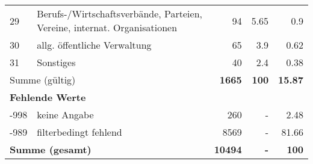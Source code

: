 \begin{longtable}{lXrrr}
        29 & \multicolumn{1}{X}{Berufs-/Wirtschaftsverbände, Parteien, Vereine, internat. Organisationen} & %
          \num{94} &
          \num[round-mode=places,round-precision=2]{5.65} &
          \num[round-mode=places,round-precision=2]{0.9} \\

        30 & \multicolumn{1}{X}{allg. öffentliche Verwaltung} & %
          \num{65} &
          \num[round-mode=places,round-precision=2]{3.9} &
          \num[round-mode=places,round-precision=2]{0.62} \\

        31 & \multicolumn{1}{X}{Sonstiges} & %
          \num{40} &
          \num[round-mode=places,round-precision=2]{2.4} &
          \num[round-mode=places,round-precision=2]{0.38} \\

     \midrule
     \multicolumn{2}{l}{Summe (gültig)} &
       \textbf{\num{1665}} &
     \textbf{\num{100}} &
       \textbf{\num[round-mode=places,round-precision=2]{15.87}} \\
     \multicolumn{5}{l}{\textbf{Fehlende Werte}}\\
       -998 &
       keine Angabe &
         \num{260} &
        - &
         \num[round-mode=places,round-precision=2]{2.48} \\
       -989 &
       filterbedingt fehlend &
         \num{8569} &
        - &
         \num[round-mode=places,round-precision=2]{81.66} \\
     \midrule
     \multicolumn{2}{l}{\textbf{Summe (gesamt)}} &
          \textbf{\num{10494}} &
        \textbf{-} &
        \textbf{\num{100}} \\
     \bottomrule
     \end{longtable}
     
